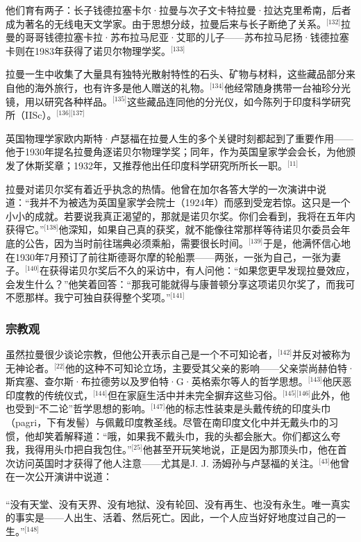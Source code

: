 他们育有两子：长子钱德拉塞卡尔·拉曼与次子文卡特拉曼·拉达克里希南，后者成为著名的无线电天文学家。由于思想分歧，拉曼后来与长子断绝了关系。\(^\text{[132]}\)拉曼的哥哥钱德拉塞卡拉·苏布拉马尼亚·艾耶的儿子——苏布拉马尼扬·钱德拉塞卡则在1983年获得了诺贝尔物理学奖。\(^\text{[133]}\)

拉曼一生中收集了大量具有独特光散射特性的石头、矿物与材料，这些藏品部分来自他的海外旅行，也有许多是他人赠送的礼物。\(^\text{[134]}\)他经常随身携带一台袖珍分光镜，用以研究各种样品。\(^\text{[135]}\)这些藏品连同他的分光仪，如今陈列于印度科学研究所（IISc）。\(^\text{[136][137]}\)

英国物理学家欧内斯特·卢瑟福在拉曼人生的多个关键时刻都起到了重要作用——他于1930年提名拉曼角逐诺贝尔物理学奖；同年，作为英国皇家学会会长，为他颁发了休斯奖章；1932年，又推荐他出任印度科学研究所所长一职。\(^\text{[11]}\)

拉曼对诺贝尔奖有着近乎执念的热情。他曾在加尔各答大学的一次演讲中说道：“我并不为被选为英国皇家学会院士（1924年）而感到受宠若惊。这只是一个小小的成就。若要说我真正渴望的，那就是诺贝尔奖。你们会看到，我将在五年内获得它。”\(^\text{[138]}\)他深知，如果自己真的获奖，就不能像往常那样等待诺贝尔委员会年底的公告，因为当时前往瑞典必须乘船，需要很长时间。\(^\text{[139]}\)于是，他满怀信心地在1930年7月预订了前往斯德哥尔摩的轮船票——两张，一张为自己，一张为妻子。\(^\text{[140]}\)在获得诺贝尔奖后不久的采访中，有人问他：“如果您更早发现拉曼效应，会发生什么？”他笑着回答：“那我可能就得与康普顿分享这项诺贝尔奖了，而我可不愿那样。我宁可独自获得整个奖项。”\(^\text{[141]}\)
\subsubsection{宗教观}
虽然拉曼很少谈论宗教，但他公开表示自己是一个不可知论者，\(^\text{[142]}\)并反对被称为无神论者。\(^\text{[22]}\)他的这种不可知论立场，主要受其父亲的影响——父亲崇尚赫伯特·斯宾塞、查尔斯·布拉德劳以及罗伯特·G·英格索尔等人的哲学思想。\(^\text{[143]}\)他厌恶印度教的传统仪式，\(^\text{[144]}\)但在家庭生活中并未完全摒弃这些习俗。\(^\text{[145][146]}\)此外，他也受到“不二论”哲学思想的影响。\(^\text{[147]}\)他的标志性装束是头戴传统的印度头巾（pagri，下有发髻）与佩戴印度教圣线。尽管在南印度文化中并无戴头巾的习惯，他却笑着解释道：“哦，如果我不戴头巾，我的头都会胀大。你们都这么夸我，我得用头巾把自我包住。”\(^\text{[25]}\)他甚至开玩笑地说，正是因为那顶头巾，他在首次访问英国时才获得了他人注意——尤其是J. J. 汤姆孙与卢瑟福的关注。\(^\text{[43]}\)他曾在一次公开演讲中说道：\\\\
“没有天堂、没有天界、没有地狱、没有轮回、没有再生、也没有永生。唯一真实的事实是——人出生、活着、然后死亡。因此，一个人应当好好地度过自己的一生。”\(^\text{[148]}\)

